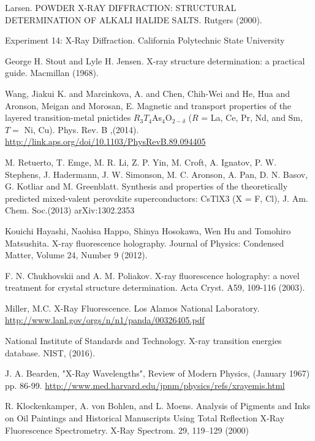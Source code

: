 \documentclass[%
 reprint,
 amsmath,amssymb,
 aps,
 pra,
]{revtex4-1}
\begin{document}
\begin{thebibliography}{6}
	 Larsen. POWDER X-RAY DIFFRACTION: STRUCTURAL DETERMINATION OF ALKALI HALIDE SALTS. Rutgers (2000).
	 
	 Experiment 14: X-Ray Diffraction. California Polytechnic State University 
	 
	 George H. Stout and Lyle H. Jensen. X-ray structure determination: a practical guide. Macmillan (1968).
	 
	 Wang, Jiakui K. and Marcinkova, A. and Chen, Chih-Wei and He, Hua and Aronson, Meigan and Morosan, E. Magnetic and transport properties of the layered transition-metal pnictides ${R}_{3}{T}_{4}$As${}_{4}$O${}_{2\ensuremath{-}\ensuremath{\delta}}$ ($R$ = La, Ce, Pr, Nd, and Sm, $T=$ Ni, Cu). Phys. Rev. B ,(2014). \url{http://link.aps.org/doi/10.1103/PhysRevB.89.094405}
	 
	 M. Retuerto, T. Emge, M. R. Li, Z. P. Yin, M. Croft, A. Ignatov, P. W. Stephens, J. Hadermann, J. W. Simonson, M. C. Aronson, A. Pan, D. N. Basov, G. Kotliar and M. Greenblatt. Synthesis and properties of the theoretically predicted mixed-valent perovskite superconductors: CsTlX3 (X = F, Cl),  J. Am. Chem. Soc.(2013) arXiv:1302.2353	 
	 
	 Kouichi Hayashi, Naohisa Happo, Shinya Hosokawa, Wen Hu and Tomohiro Matsushita. X-ray fluorescence holography. Journal of Physics: Condensed Matter, Volume 24, Number 9 (2012).
	 
	 F. N. Chukhovskii and A. M. Poliakov. X-ray fluorescence holography: a novel treatment for crystal structure determination. Acta Cryst. A59, 109-116 (2003).
	 
	 Miller, M.C. X-Ray Fluorescence. Los Alamos National Laboratory. \url{http://www.lanl.gov/orgs/n/n1/panda/00326405.pdf}
	 
	 National Institute of Standards and Technology. X-ray transition energies database. NIST, (2016).
	 
	 J. A. Bearden, "X-Ray Wavelengths", Review of Modern Physics, (January 1967) pp. 86-99. \url{http://www.med.harvard.edu/jpnm/physics/refs/xrayemis.html}

	R. Klockenkamper, A. von Bohlen, and L. Moens. Analysis of Pigments and Inks on Oil Paintings and Historical Manuscripts Using Total Reflection X-Ray Fluorescence Spectrometry. X-Ray Spectrom. 29, 119–129 (2000)
	

\end{thebibliography}
\end{document}
